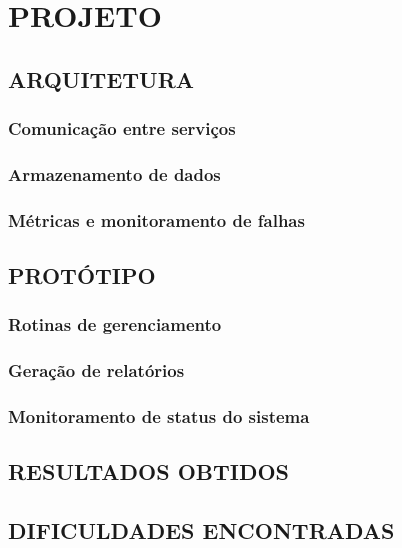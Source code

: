 \chapter{PROJETO}
\label{chp:projeto}

\section{ARQUITETURA}

\subsection{Comunicação entre serviços}

\subsection{Armazenamento de dados}

\subsection{Métricas e monitoramento de falhas}

\section{PROTÓTIPO}

\subsection{Rotinas de gerenciamento}

\subsection{Geração de relatórios}

\subsection{Monitoramento de status do sistema}

\section{RESULTADOS OBTIDOS}

\section{DIFICULDADES ENCONTRADAS}
